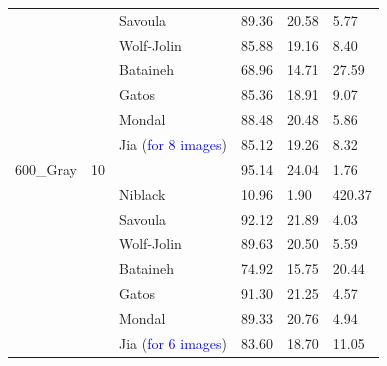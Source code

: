 \documentclass[runningheads]{llncs}
\begin{document}
\begin{table}[bht!]
\begin{threeparttable}
\begin{tabular}{ P{1.4cm} P{1.2cm} P{1.8cm} P{1.8cm} P{1.2cm} P{1.4cm} }
			\\ & & Savoula & 89.36 & 20.58 & 5.77 
			\\ & & Wolf-Jolin & 85.88 & 19.16 & 8.40 \\ 
			& & Bataineh \cite{Bataineh2011} & 68.96 & 14.71 & 27.59 \\
			& & Gatos \cite{Gatos2006} & 85.36 & 18.91 & 9.07 \\
			& & Mondal \cite{Mondal2019} & 88.48 & 20.48 & 5.86 \\
			& & Jia \cite{Jia2018} (\textcolor{blue}{for 8 images}) & 85.12 & 19.26 & 8.32 \\
			\midrule
			\centering
			{600\_Gray}  & 10 &  &95.14 &24.04 &1.76  
			\\ & & Niblack & 10.96 & 1.90 & 420.37 
			\\ & & Savoula & 92.12 & 21.89 & 4.03 
			\\ & & Wolf-Jolin & 89.63 & 20.50 & 5.59
			\\ & & Bataineh \cite{Bataineh2011} & 74.92 & 15.75 & 20.44 \\ 
			& & Gatos \cite{Gatos2006} & 91.30 & 21.25 & 4.57 \\ 
			& & Mondal \cite{Mondal2019} & 89.33 & 20.76 & 4.94 \\
			& & Jia \cite{Jia2018} (\textcolor{blue}{for 6 images}) & 83.60 & 18.70 & 11.05 \\
			\midrule 
			\midrule
			

\end{tabular}
\end{threeparttable}
\end{table}
\end{document}

